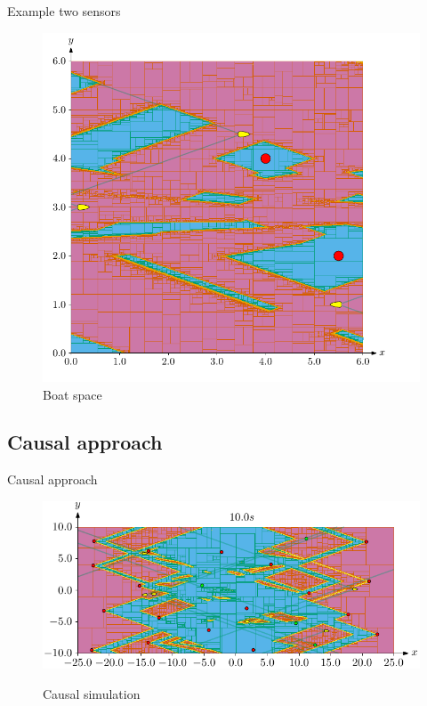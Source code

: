 \documentclass{beamer}
\begin{document}
\begin{frame}{Example two sensors}
\begin{minipage}{0.45\textwidth}
\begin{figure}
                            \includegraphics[width=\textwidth]{imgs/ex_boat_space}
                            \caption{Boat space}
                    \end{figure}
                \end{minipage}
            \end{frame}

        \subsection{Causal approach}

            \begin{frame}{Causal approach}
                \begin{figure}
                    \centering
                    \href{run:causal.mp4?autostart}{\includegraphics[width=\textwidth]{imgs/causal_cover}}
                    \caption{Causal simulation}
                \end{figure}
            \end{frame}
\end{document}
